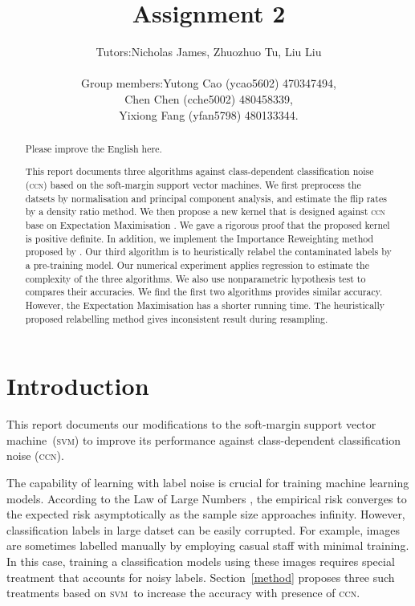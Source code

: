 \documentclass[12pt]{article} %
\title{Assignment 2}
\newcommand{\svm}{\textsc{svm}}
\begin{document}
\author{%
 \begin{tabular}{rl}
  Tutors:& Nicholas James, Zhuozhuo Tu, Liu Liu\\ \\
Group members: & Yutong Cao (ycao5602) 470347494,\\
& Chen Chen (cche5002) 480458339,\\
& Yixiong Fang (yfan5798) 480133344.
\end{tabular}
}

\maketitle



\begin{abstract}
{\color{red}Please improve the English here.}

This report documents three algorithms against class-dependent classification noise (\textsc{ccn}) based on the soft-margin support vector machines. We first preprocess the datsets by normalisation and principal component analysis, and estimate the flip rates by a density ratio method. We then propose a new kernel that is designed against \textsc{ccn} base on Expectation Maximisation . We gave a rigorous proof that the proposed kernel is positive definite. In addition, we implement the Importance Reweighting method proposed by \citet{liu2016classification}. Our third algorithm is to heuristically relabel the contaminated labels by a pre-training model. Our numerical experiment applies regression to estimate the complexity of the three algorithms. We also use nonparametric hypothesis test to compares their accuracies. We find the first two algorithms provides similar accuracy. However, the Expectation Maximisation has a shorter running time. The heuristically proposed relabelling method gives inconsistent result during resampling.
\end{abstract}
\tableofcontents
\section{Introduction}
This report documents our modifications to the soft-margin support vector machine~(\svm) to improve its performance against class-dependent classification noise (\textsc{ccn}).

The capability of learning with label noise is crucial for training machine learning models. According to the Law of Large Numbers \citep{hardle2007applied}, the empirical risk converges to the expected risk asymptotically as the sample size approaches infinity. However, classification labels in large datset can be easily corrupted. For example, images  are sometimes labelled manually by employing casual staff with minimal training. In this case, training a classification models using these images requires special treatment that accounts for noisy labels. Section~\ref{method} proposes three such treatments based on \svm\ to increase the accuracy with presence of \textsc{ccn}.
\end{document}

